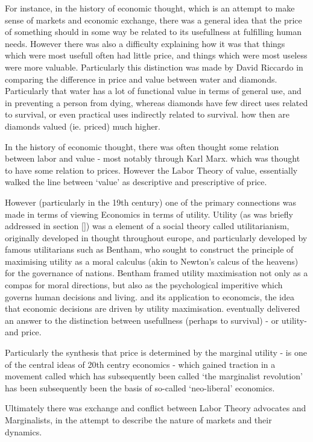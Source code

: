 For instance, in the history of economic thought, which is an attempt to make sense of markets and economic exchange, there was a general idea that the price of something should in some way be related to its usefullness at fulfilling human needs.
However there was also a difficulty explaining how it was that things which were most usefull often had little price, and things which were most useless were more valuable.
Particularly this distinction was made by David Riccardo in comparing the difference in price and value between water and diamonds.
Particularly that water has a lot of functional value in terms of general use, and in preventing a person from dying, whereas diamonds have few direct uses related to survival, or even practical uses indirectly related to survival.
how then are diamonds valued (ie. priced) much higher.

In the history of economic thought, there was often thought some relation between labor and value - most notably through Karl Marx.
which was thought to have some relation to prices. However the Labor Theory of value, essentially walked the line between `value' as descriptive and prescriptive of price.

However (particularly in the 19th century) one of the primary connections was made in terms of viewing Economics in terms of utility.
Utility (as was briefly addressed in section \ref{}) was a element of a social theory called utilitarianism, originally developed in thought throughout europe, and particularly developed by famous utilitarians such as Bentham, who sought to construct the principle of maximising utility as a moral calculus (akin to Newton's calcus of the heavens) for the governance of nations.
Bentham framed utility maximisation not only as a compas for moral directions, but also as the psychological imperitive which governs human decisions and living.
and its application to economcis, the idea that economic decisions are driven by utility maximisation.
eventually delivered an answer to the distinction between usefullness (perhaps to survival) - or utility- and price.

Particularly the synthesis that price is determined by the marginal utility - is one of the central ideas of 20th centry economics - which gained traction in a movement called which has subsequently been called `the marginalist revolution' has been subsequently been the basis of so-called `neo-liberal' economics.

Ultimately there was exchange and conflict between Labor Theory advocates and Marginalists, in the attempt to describe the nature of markets and their dynamics.

